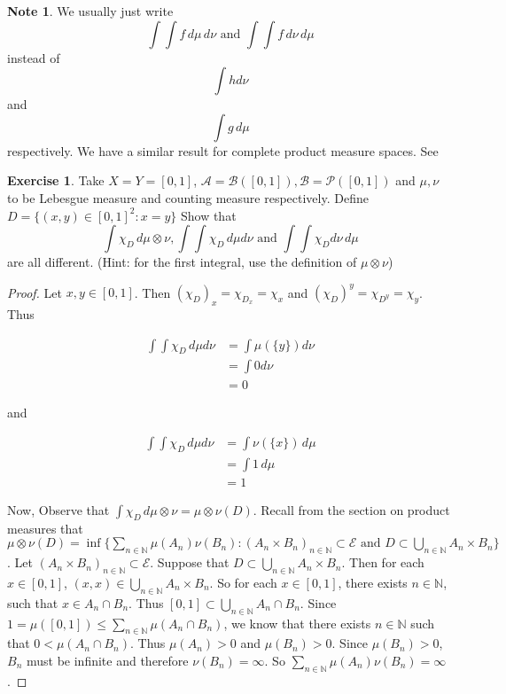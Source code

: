 \documentclass[12pt]{amsart}
\theoremstyle{definition}
\newtheorem{note}[definition]{Note}
\newtheorem{ex}[definition]{Exercise}
\newcommand{\N}{\mathbb{N}}
\newcommand{\MA}{\mathcal{A}}
\newcommand{\MB}{\mathcal{B}}
\newcommand{\MP}{\mathcal{P}}
\newcommand{\ME}{\mathcal{E}}
\newcommand{\dmu}{\, d \mu}
\newcommand{\dnu}{\, d \nu}
\newcommand{\lex}[1]{\label{ex:#1}}
\begin{document}
	\begin{note}
		We usually just write $$\int \int f \dmu \dnu \text{ and } \int \int f \dnu \dmu$$ instead of $$\int h d\nu$$ and $$\int g \dmu $$ respectively. We have a similar result for complete product measure spaces. See 
	\end{note}
	
	\begin{ex} \lex{00000} 
		Take $X=Y= [0,1]$, $\MA = \MB([0,1]), \MB = \MP([0,1])$ and $\mu,\nu$ to be Lebesgue measure and counting measure respectively. Define $D = \{(x,y) \in [0,1]^2: x=y\}$ Show that $$\int \chi_D \dmu \otimes \nu, \int \int \chi_D \dmu d \nu \text{ and } \int \int \chi_D d\nu \dmu$$ are all different. (Hint: for the first integral, use the definition of $\mu \otimes \nu$)
	\end{ex}
	
	\begin{proof}
		Let $x,y \in [0,1]$. Then $(\chi_D)_x = \chi_{D_x} = \chi_{x}$ and $(\chi_D)^y = \chi_{D^y} = \chi_{y}$. Thus
		
		\begin{align*}
			\int \int \chi_D \dmu d \nu
			&= \int \mu(\{y\}) d\nu\\
			&= \int 0 d\nu\\
			&= 0
		\end{align*}
		
		and
		
		\begin{align*}
			\int \int \chi_D \dmu d \nu
			&= \int \nu(\{x\}) \dmu\\
			&= \int 1 \dmu\\
			&= 1
		\end{align*}
		
		Now, Observe that $\int \chi_D \dmu \otimes \nu = \mu \otimes \nu(D)$. Recall from the section on product measures that $\mu \otimes \nu(D) = \inf \{\sum_{n \in \N}\mu(A_n)\nu(B_n): (A_n \times B_n)_{n \in \N} \subset \ME \text{ and } D \subset \bigcup_{n \in \N} A_n \times B_n \}$. Let $(A_n \times B_n)_{n \in \N} \subset \ME$. Suppose that $D \subset \bigcup_{n \in \N}A_n \times B_n$. Then for each $x \in [0,1]$, $(x,x) \in  \bigcup_{n \in \N} A_n \times B_n$. So for each $x \in [0,1]$, there exists $n \in \N$, such that $x \in A_n \cap B_n$. Thus $[0,1] \subset \bigcup_{n \in \N} A_n \cap B_n.$ Since $1  = \mu([0,1]) \leq \sum_{n \in \N}\mu(A_n \cap B_n)$, we know that there exists $n \in \N$ such that $0 < \mu(A_n \cap B_n)$. Thus $\mu(A_n)> 0$ and $\mu(B_n) > 0$. Since $\mu(B_n) > 0$, $B_n$ must be infinite and therefore $\nu(B_n) = \infty$. So $\sum_{n \in \N} \mu(A_n)\nu(B_n) = \infty$.
		
	\end{proof}
	
\end{document}
